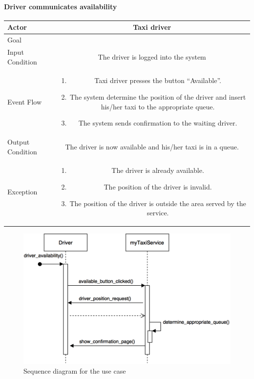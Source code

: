 \documentclass[a4paper,12pt]{article}%
\newcommand{\usecasetable}[6]{
\begin{center}
\def\arraystretch{1.5}
\begin{tabularx}{\textwidth}{|s|C|}
\hline
Actor & #1\\
\hline
Goal & #2\\
\hline
Input Condition & #3 \\
\hline
Event Flow & #4\\
\hline
Output Condition & #5\\
\hline
Exception & #6\\
\hline
\end{tabularx}
\end{center}
}
\begin{document}
\paragraph{Driver communicates availability}
\usecasetable{Taxi driver}{}{The driver is logged into the system}
{
\begin{minipage}[b]{11cm}
\begin{enumerate}
\item Taxi driver presses the button ``Available''.
\item The system determine the position of the driver and insert his/her taxi to the appropriate queue.
\item The system sends confirmation to the waiting driver.
\end{enumerate}
\end{minipage}
}
{The driver is now available and his/her taxi is in a queue.}
{
\begin{minipage}[b]{11cm}
\begin{enumerate}
\item The driver is already available.
\item The position of the driver is invalid.
\item The position of the driver is outside the area served by the service.
\end{enumerate}
\end{minipage}
}
\begin{figure}[H]
\centering
\includegraphics[scale=.3]{driver_availability.png}
\caption{Sequence diagram for the use case}
\end{figure}
\break
\end{document}
